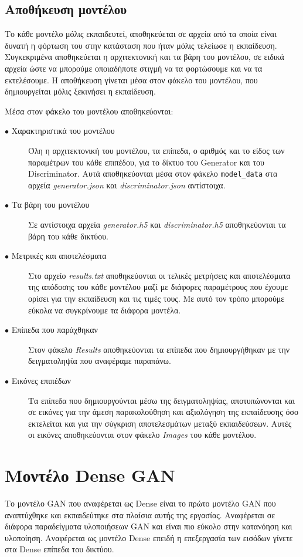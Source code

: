 \subsection{Αποθήκευση μοντέλου}
Το κάθε μοντέλο μόλις εκπαιδευτεί, αποθηκεύεται σε αρχεία από τα οποία είναι δυνατή η φόρτωση του στην κατάσταση που ήταν μόλις τελείωσε η εκπαίδευση. Συγκεκριμένα αποθηκεύεται η αρχιτεκτονική και τα βάρη του μοντέλου, σε ειδικά αρχεία ώστε να μπορούμε οποιαδήποτε στιγμή να τα φορτώσουμε και να τα εκτελέσουμε. Η αποθήκευση γίνεται μέσα στον φάκελο του μοντέλου, που δημιουργείται μόλις ξεκινήσει η εκπαίδευση.
\par
Μέσα στον φάκελο του μοντέλου αποθηκεύονται:
\begin{description}
\item[$\bullet$ Χαρακτηριστικά του μοντέλου] Όλη η αρχιτεκτονική του μοντέλου, τα επίπεδα, ο αριθμός και το είδος των παραμέτρων του κάθε επιπέδου, για το δίκτυο του Generator και του Discriminator. Αυτά αποθηκεύονται μέσα στον φάκελο \texttt{model\_data} στα αρχεία  \textit{generator.json} και \textit{discriminator.json} αντίστοιχα.
\item[$\bullet$ Τα βάρη του μοντέλου] Σε αντίστοιχα αρχεία \textit{generator.h5} και \textit{discriminator.h5} αποθηκεύονται τα βάρη του κάθε δικτύου.
\item[$\bullet$ Μετρικές και αποτελέσματα] Στο αρχείο \textit{results.txt} αποθηκεύονται οι τελικές μετρήσεις και αποτελέσματα της απόδοσης του κάθε μοντέλου μαζί με διάφορες παραμέτρους που έχουμε ορίσει για την εκπαίδευση και τις τιμές τους. Με αυτό τον τρόπο μπορούμε εύκολα να συγκρίνουμε τα διάφορα μοντέλα.
\item[$\bullet$ Επίπεδα που παράχθηκαν] Στον φάκελο \textit{Results} αποθηκεύονται τα επίπεδα που δημιουργήθηκαν με την δειγματοληψία που αναφέραμε παραπάνω.
\item[$\bullet$ Εικόνες επιπέδων] Τα επίπεδα που δημιουργούνται μέσω της δειγματοληψίας, αποτυπώνονται και σε εικόνες για την άμεση παρακολούθηση και αξιολόγηση της εκπαίδευσης όσο εκτελείται και για την σύγκριση αποτελεσμάτων μεταξύ εκπαιδεύσεων. Αυτές οι εικόνες αποθηκεύονται στον φάκελο \textit{Images} του κάθε μοντέλου.
\end{description}

\section{Μοντέλο Dense GAN}

Το μοντέλο GAN που αναφέρεται ως Dense είναι το πρώτο μοντέλο GAN που αναπτύχθηκε και εκπαιδεύτηκε στα πλαίσια αυτής της εργασίας. Αναφέρεται σε διάφορα παραδείγματα υλοποιήσεων GAN \cite{firstgan3} \cite{firstgan} \cite{firstgan2} και είναι πιο εύκολο στην κατανόηση και υλοποίηση. Αναφέρεται ως μοντέλο Dense επειδή η επεξεργασία των εισόδων γίνετε στα Dense επίπεδα του δικτύου.

